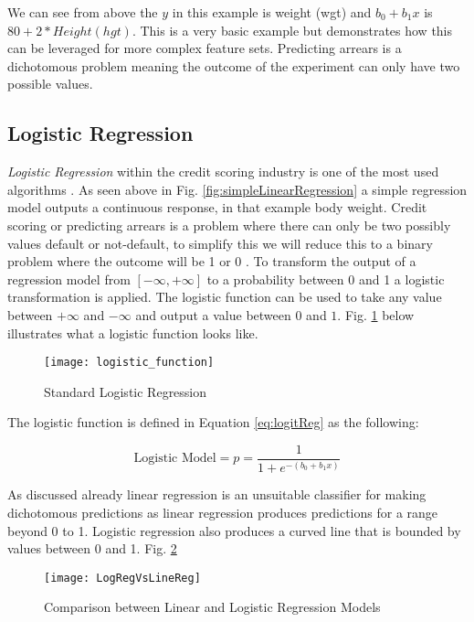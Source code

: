 We can see from above the $y$ in this example is weight (wgt) and $b_0 + b_1x$ is $80 + 2*Height(hgt)$. This is a very basic example but demonstrates how this can be leveraged for more complex feature sets. Predicting arrears is a dichotomous problem meaning the outcome of the experiment can only have two possible values. 

\subsection{Logistic Regression} \label{LogReg}
\textit{Logistic Regression} \cite[See:][]{hosmer_applied_2000} within the credit scoring industry is one of the most used algorithms \citep{hand_evaluating_2010}. As seen above in Fig. \ref{fig:simpleLinearRegression} a simple regression model outputs a continuous response, in that example body weight. Credit scoring or predicting arrears is a problem where there can only be two possibly values default or not-default, to simplify this we will reduce this to a binary problem where the outcome will be 1 or 0 \citep{zou_modified_2004}. To transform the output of a regression model from $[-\infty, +\infty]$ to a probability between 0 and 1 a logistic transformation is applied. The logistic function can be used to take any value between $+\infty$ and $-\infty$ and output a value between $0$ and $1$. Fig. \ref{fig:logistic_function} below illustrates what a logistic function looks like.


\begin{figure}[H]
	\texttt{[image: logistic\_function]}
	\caption[Standard Logistic Regression]
	{Standard Logistic Regression}
	\label{fig:logistic_function}
\end{figure}

The logistic function is defined in Equation \ref{eq:logitReg} as the following: 

\begin{equation} \label{eq:logitReg}
	\text{Logistic Model}  =  p  =  \frac{1}{1 + e^{-(b_0 + b_1x)}}
\end{equation}

As discussed already linear regression is an unsuitable classifier for making dichotomous predictions as linear regression produces predictions for a range beyond 0 to 1. Logistic regression also produces a curved line that is bounded by values between 0 and 1. Fig. \ref{fig:LogRegVsLineReg}

\begin{figure}[H]
	\texttt{[image: LogRegVsLineReg]}
	\caption{Comparison between Linear and Logistic Regression Models}
	\label{fig:LogRegVsLineReg}
\end{figure}

